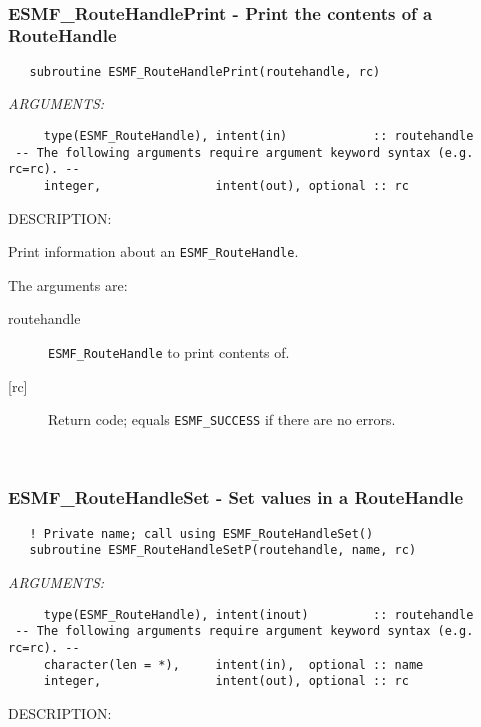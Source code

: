  
\mbox{}\hrulefill\ 
 
\subsubsection [ESMF\_RouteHandlePrint] {ESMF\_RouteHandlePrint - Print the contents of a RouteHandle}


 
\begin{verbatim}   subroutine ESMF_RouteHandlePrint(routehandle, rc)\end{verbatim}{\em ARGUMENTS:}
\begin{verbatim}     type(ESMF_RouteHandle), intent(in)            :: routehandle      
 -- The following arguments require argument keyword syntax (e.g. rc=rc). --
     integer,                intent(out), optional :: rc\end{verbatim}
{\sf DESCRIPTION:\\ }


     Print information about an {\tt ESMF\_RouteHandle}.
  
     The arguments are:
     \begin{description}
     \item[routehandle] 
       {\tt ESMF\_RouteHandle} to print contents of.
     \item[{[rc]}] 
       Return code; equals {\tt ESMF\_SUCCESS} if there are no errors.
     \end{description}
   
 
\mbox{}\hrulefill\ 
 
\subsubsection [ESMF\_RouteHandleSet] {ESMF\_RouteHandleSet - Set values in a RouteHandle}


 
\begin{verbatim}   ! Private name; call using ESMF_RouteHandleSet()
   subroutine ESMF_RouteHandleSetP(routehandle, name, rc)\end{verbatim}{\em ARGUMENTS:}
\begin{verbatim}     type(ESMF_RouteHandle), intent(inout)         :: routehandle
 -- The following arguments require argument keyword syntax (e.g. rc=rc). --
     character(len = *),     intent(in),  optional :: name    
     integer,                intent(out), optional :: rc
 \end{verbatim}
{\sf DESCRIPTION:\\ }


